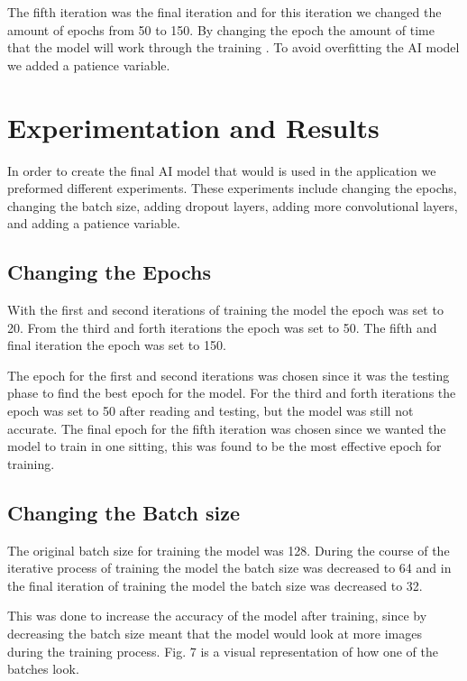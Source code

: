 \documentclass[conference]{IEEEtran}
\begin{document}
The fifth iteration was the final iteration and for this iteration we changed the amount of epochs from 50 to 150. By changing the epoch the amount of time that the model will work through the training \cite{b4}. To avoid overfitting the AI model we added a patience variable.

\section{Experimentation and Results}

In order to create the final AI model that would is used in the application we preformed different experiments. These experiments include changing the epochs, changing the batch size, adding dropout layers, adding more convolutional layers, and adding a patience variable.

\subsection{Changing the Epochs}

With the first and second iterations of training the model the epoch was set to 20. From the third and forth iterations the epoch was set to 50. The fifth and final iteration the epoch was set to 150.

The epoch for the first and second iterations was chosen since it was the testing phase to find the best epoch for the model. For the third and forth iterations the epoch was set to 50 after reading \cite{b4} and testing, but the model was still not accurate. The final epoch for the fifth iteration was chosen since we wanted the model to train in one sitting, this was found to be the most effective epoch for training.

\subsection{Changing the Batch size}

The original batch size for training the model was 128. During the course of the iterative process of training the model the batch size was decreased to 64 and in the final iteration of training the model the batch size was decreased to 32.

This was done to increase the accuracy of the model after training, since by decreasing the batch size meant that the model would look at more images during the training process. Fig. 7 is a visual representation of how one of the batches look.
\end{document}
